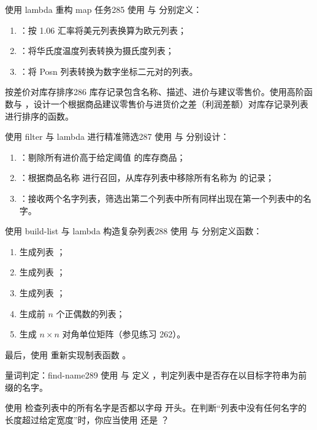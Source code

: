 \begin{exercise}{使用 lambda 重构 map 任务}{285}
使用  与  分别定义：
\begin{enumerate}
  \item {}：按 1.06 汇率将美元列表换算为欧元列表；
  \item {}：将华氏度温度列表转换为摄氏度列表；
  \item {}：将 Posn 列表转换为数字坐标二元对的列表。
\end{enumerate}
\end{exercise}

\begin{exercise}{按差价对库存排序}{286}
库存记录包含名称、描述、进价与建议零售价。使用高阶函数与 ，设计一个根据商品建议零售价与进货价之差（利润差额）对库存记录列表进行排序的函数。
\end{exercise}

\begin{exercise}{使用 filter 与 lambda 进行精准筛选}{287}
使用  与  分别设计：
\begin{enumerate}
  \item {}：剔除所有进价高于给定阈值  的库存商品；
  \item {}：根据商品名称  进行召回，从库存列表中移除所有名称为  的记录；
  \item {}：接收两个名字列表，筛选出第二个列表中所有同样出现在第一个列表中的名字。
\end{enumerate}
\end{exercise}

\begin{exercise}{使用 build-list 与 lambda 构造复杂列表}{288}
使用  与  分别定义函数：
\begin{enumerate}
  \item 生成列表 ；
  \item 生成列表 ；
  \item 生成列表 ；
  \item 生成前 $n$ 个正偶数的列表；
  \item 生成 $n \times n$ 对角单位矩阵（参见练习 262）。
\end{enumerate}
最后，使用  重新实现制表函数 。
\end{exercise}

\begin{exercise}{量词判定：find-name}{289}
使用  与  定义 ，判定列表中是否存在以目标字符串为前缀的名字。

使用  检查列表中的所有名字是否都以字母  开头。在判断“列表中没有任何名字的长度超过给定宽度”时，你应当使用  还是 ？
\end{exercise}

